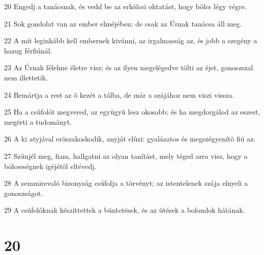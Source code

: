 \par 20 Engedj a tanácsnak, és vedd be az erkölcsi oktatást, hogy bölcs légy végre.
\par 21 Sok gondolat van az ember elméjében; de csak az Úrnak tanácsa áll meg.
\par 22 A mit leginkább kell embernek kivánni, az irgalmasság az, és jobb a szegény a hazug férfiúnál.
\par 23 Az Úrnak félelme életre visz; és az ilyen megelégedve tölti az éjet, gonoszszal nem illettetik.
\par 24 Bemártja a rest az õ kezét a tálba, de már a szájához nem viszi vissza.
\par 25 Ha a csúfolót megvered, az együgyû lesz okosabb; és ha megdorgálod az eszest, megérti a tudományt.
\par 26 A ki atyjával erõszakoskodik, anyját elûzi: gyalázatos és megszégyenítõ fiú az.
\par 27 Szünjél meg, fiam, hallgatni az olyan tanítást, mely téged arra visz, hogy a bölcseségnek igéjétõl eltévedj.
\par 28 A semmirevaló bizonyság csúfolja a törvényt; az istentelenek szája elnyeli a gonoszságot.
\par 29 A csúfolóknak készíttettek a büntetések, és az ütések a bolondok hátának.

\chapter{20}


